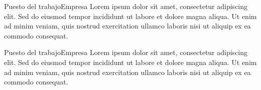 \titleForExperience

\begin{itemize}
    \begin{workEntry}{Puesto del trabajo}{Empresa}{}
        Lorem ipsum dolor sit amet, consectetur adipiscing elit. Sed do eiusmod tempor incididunt ut labore et dolore magna aliqua. Ut enim ad minim veniam, quis nostrud exercitation ullamco laboris nisi ut aliquip ex ea commodo consequat.
    \end{workEntry}

    \begin{workEntry}{Puesto del trabajo}{Empresa}{}
         Lorem ipsum dolor sit amet, consectetur adipiscing elit. Sed do eiusmod tempor incididunt ut labore et dolore magna aliqua. Ut enim ad minim veniam, quis nostrud exercitation ullamco laboris nisi ut aliquip ex ea commodo consequat.
    \end{workEntry}
\end{itemize}

